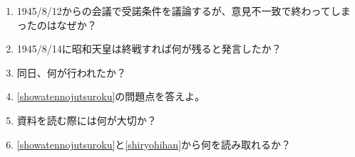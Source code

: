 \documentclass[]{jsarticle}
\begin{document}
\begin{enumerate}
	\item 1945/8/12からの会議で受諾条件を議論するが、意見不一致で終わってしまったのはなぜか？
	\item 1945/8/14に昭和天皇は終戦すれば何が残ると発言したか？
	\item 同日、何が行われたか？
	\\
	\item \ref{showatennojutsuroku}の問題点を答えよ。
	\item 資料を読む際には何が大切か？\label{shiryohihan}
	\item \ref{showatennojutsuroku}と\ref{shiryohihan}から何を読み取れるか？
\end{enumerate}

\begin{comment}
	\begin{figure}[htbp]
		\begin{center}
			\texttt{[image: ./src/RC\_series\_circuit\_c.png]}
			\caption{RC直列回路 ($V_C$の測定)}
			\label{fig:RC_series_circuit_c}
		\end{center}
	\end{figure}
	\begin{equation}
		\label{Relationship_between_impedance_Z}
		V = ZI [\si{\volt}], I = \frac{V}{Z} [\si{\ampere}], Z = \frac{V}{I}[\si{\ohm}]
	\end{equation}
	\begin{table}[h]
		\caption{計測および実験補助器具}
		\label{tab:fixtures}
		\centering
		\begin{tabular}{|c|c|c|c|}
			\hline
			器具名 & 製造元 & 計器番号 & 定格 \\
		\end{tabular}
	\end{table}
\end{comment}
\end{document}
